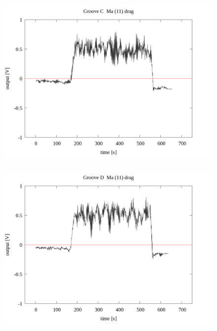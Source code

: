 \documentclass[a4paper]{jsarticle}
\begin{document}
\begin{figure}[htbp]
    \footnotesize
    \begin{center}
        \includegraphics[width=140mm]{../../../33_result/210806/moving_average/11/drag/Groove_C_ma(11)_drag.png}
    \end{center}
\end{figure}

\begin{figure}[htbp]
    \footnotesize
    \begin{center}
        \includegraphics[width=140mm]{../../../33_result/210806/moving_average/11/drag/Groove_D_ma(11)_drag.png}
    \end{center}
\end{figure}
\end{document}
